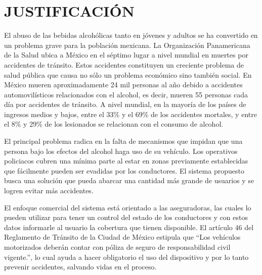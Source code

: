 \section{JUSTIFICACIÓN}
El abuso de las bebidas alcohólicas tanto en jóvenes y adultos se ha convertido en un problema grave para la población mexicana. La Organización Panamericana de la Salud ubica a México en el séptimo lugar a nivel mundial en muertes por accidentes de tránsito. Estos accidentes constituyen un creciente problema de salud pública que causa no sólo un problema económico sino también social. En México mueren aproximadamente 24 mil personas al año debido a accidentes automovilísticos relacionados con el alcohol, es decir, mueren 55 personas cada día por accidentes de tránsito. A nivel mundial, en la mayoría de los países de ingresos medios y bajos, entre el 33\% y el 69\% de los accidentes mortales, y entre el 8\% y 29\% de los lesionados se relacionan con el consumo de alcohol. \cite{beber_y_conducir} \par
El principal problema radica en la falta de mecanismos que impidan que una persona bajo los efectos del alcohol haga uso de su vehículo. Los operativos policiacos cubren una mínima parte al estar en zonas previamente establecidas que fácilmente pueden ser evadidas por los conductores. El sistema propuesto busca una solución que pueda abarcar una cantidad más grande de usuarios y se logren evitar más accidentes. \par
El enfoque comercial del sistema está orientado a las aseguradoras, las cuales lo pueden utilizar para tener un control del estado de los conductores y con estos datos informarle al usuario la cobertura que tienen disponible. El artículo 46 del Reglamento de Tránsito de la Ciudad de México estipula que “Los vehículos motorizados deberán contar con póliza de seguro de responsabilidad civil vigente.”, lo cual ayuda a hacer obligatorio el uso del dispositivo y por lo tanto prevenir accidentes, salvando vidas en el proceso. \cite{reglamento_de_transito}